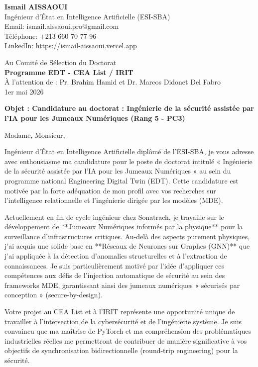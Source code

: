 \documentclass[11pt,a4paper]{article}
\begin{document}
\noindent \textbf{Ismail AISSAOUI} \\
Ingénieur d'État en Intelligence Artificielle (ESI-SBA) \\
Email: ismail.aissaoui.pro@gmail.com \\
Téléphone: +213 660 70 77 96 \\
LinkedIn: https://ismail-aissaoui.vercel.app

\bigskip

\begin{flushright}
    Au Comité de Sélection du Doctorat \\
    \textbf{Programme EDT - CEA List / IRIT} \\
    À l'attention de : Pr. Brahim Hamid et Dr. Marcos Didonet Del Fabro \\
    \medskip
    1er mai 2026
\end{flushright}

\bigskip

\noindent \textbf{Objet : Candidature au doctorat : Ingénierie de la sécurité assistée par l'IA pour les Jumeaux Numériques (Rang 5 - PC3)}

\bigskip

Madame, Monsieur,

Ingénieur d'État en Intelligence Artificielle diplômé de l'ESI-SBA, je vous adresse avec enthousiasme ma candidature pour le poste de doctorat intitulé « Ingénierie de la sécurité assistée par l'IA pour les Jumeaux Numériques » au sein du programme national Engineering Digital Twin (EDT). Cette candidature est motivée par la forte adéquation de mon profil avec vos recherches sur l'intelligence relationnelle et l'ingénierie dirigée par les modèles (MDE).

Actuellement en fin de cycle ingénieur chez Sonatrach, je travaille sur le développement de **Jumeaux Numériques informés par la physique** pour la surveillance d'infrastructures critiques. Au-delà des aspects purement physiques, j'ai acquis une solide base en **Réseaux de Neurones sur Graphes (GNN)** que j'ai appliquée à la détection d'anomalies structurelles et à l'extraction de connaissances. Je suis particulièrement motivé par l'idée d'appliquer ces compétences aux défis de l'injection automatique de sécurité au sein des frameworks MDE, garantissant ainsi des jumeaux numériques « sécurisés par conception » (secure-by-design).

Votre projet au CEA List et à l'IRIT représente une opportunité unique de travailler à l'intersection de la cybersécurité et de l'ingénierie système. Je suis convaincu que ma maîtrise de PyTorch et ma compréhension des problématiques industrielles réelles me permettront de contribuer de manière significative à vos objectifs de synchronisation bidirectionnelle (round-trip engineering) pour la sécurité.
\end{document}

